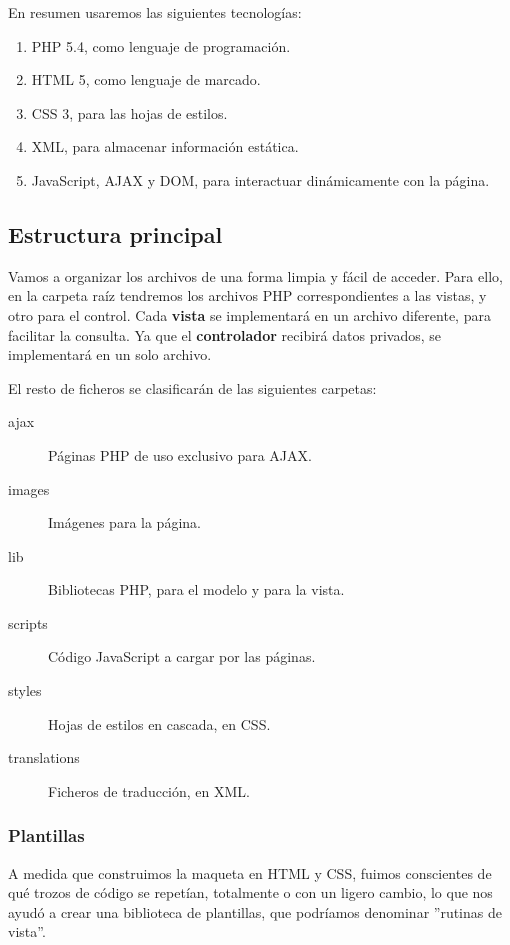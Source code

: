 En resumen usaremos las siguientes tecnologías:

\begin{enumerate}
	\item PHP 5.4, como lenguaje de programación.
	\item \acrshort{HTML} 5, como lenguaje de marcado.
	\item \acrshort{CSS} 3, para las hojas de estilos.
	\item \acrshort{XML}, para almacenar información estática.
	\item JavaScript, \acrshort{AJAX} y \acrshort{DOM}, para interactuar dinámicamente con la página.
\end{enumerate}

\subsection{Estructura principal}

Vamos a organizar los archivos de una forma limpia y fácil de acceder. Para ello, en la carpeta raíz tendremos los archivos PHP correspondientes a las vistas, y otro para el control. Cada \textbf{vista} se implementará en un archivo diferente, para facilitar la consulta. Ya que el \textbf{controlador} recibirá datos privados, se implementará en un solo archivo.

El resto de ficheros se clasificarán de las siguientes carpetas:

\begin{description}
	\item[ajax] Páginas PHP de uso exclusivo para \acrshort{AJAX}.
	\item[images] Imágenes para la página.
	\item[lib] Bibliotecas PHP, para el modelo y para la vista.
	\item[scripts] Código JavaScript a cargar por las páginas.
	\item[styles] Hojas de estilos en cascada, en \acrshort{CSS}.
	\item[translations] Ficheros de traducción, en \acrshort{XML}.
\end{description}

\subsubsection{Plantillas}

A medida que construimos la maqueta en \acrshort{HTML} y \acrshort{CSS}, fuimos conscientes de qué trozos de código se repetían, totalmente o con un ligero cambio, lo que nos ayudó a crear una biblioteca de plantillas, que podríamos denominar ''rutinas de vista''.

